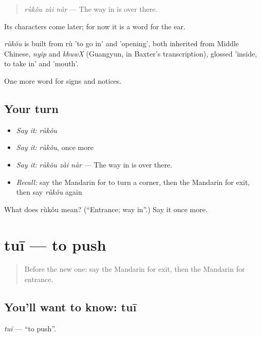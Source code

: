 \begin{quote}
\emph{rùkǒu zài nàr} — The way in is over there.
\end{quote}

Its characters come later; for now it is a word for the ear.

\begin{cousinweb}
\emph{rùkǒu} is built from rù 'to go in' and  'opening', both inherited from Middle Chinese, \emph{nyip} and \emph{khuwX} (Guangyun, in Baxter's transcription), glossed 'inside, to take in' and 'mouth'.
\end{cousinweb}

\begin{grammarlens}[title={What you've built}]
One more word for signs and notices.
\end{grammarlens}

\subsection*{Your turn}
\begin{itemize}
\raggedright
  \item \emph{Say it:} \emph{rùkǒu}
  \item \emph{Say it:} \emph{rùkǒu}, once more
  \item \emph{Say it:} \emph{rùkǒu zài nàr} — The way in is over there.
  \item \emph{Recall:} say the Mandarin for to turn a corner, then the Mandarin for exit, then say \emph{rùkǒu} again
\end{itemize}

\begin{tcolorbox}[breakable,colback=teal!4,colframe=teal!35!black,title={Before you move on}]
What does rùkǒu mean? (\textquotedblleft{}Entrance; way in\textquotedblright{}.) Say it once more.
\end{tcolorbox}
\section[tuī]{tuī — to push}

\label{lesson:ZH-C112-tui}



\begin{quote}
Before the new one: say the Mandarin for exit, then the Mandarin for entrance.
\end{quote}

\subsection*{You'll want to know: tuī}
\emph{tuī} — \textquotedblleft{}to push\textquotedblright{}.

